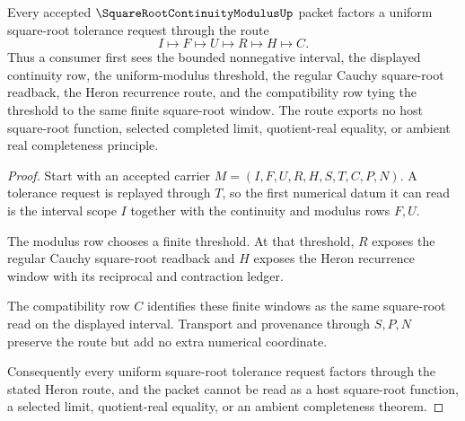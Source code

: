 \begin{theorem}
\label{thm:square-root-continuity-modulus-heron-route}
Every accepted $\SquareRootContinuityModulusUp$ packet factors a uniform square-root tolerance request through the route
$$
I \longmapsto F \longmapsto U \longmapsto R \longmapsto H \longmapsto C .
$$
Thus a consumer first sees the bounded nonnegative interval, the displayed continuity row, the uniform-modulus threshold, the regular Cauchy square-root readback, the Heron recurrence route, and the compatibility row tying the threshold to the same finite square-root window. The route exports no host square-root function, selected completed limit, quotient-real equality, or ambient real completeness principle.
\end{theorem}
\begin{proof}
Start with an accepted carrier $M=(I,F,U,R,H,S,T,C,P,N)$. A tolerance request is replayed through $T$, so the first numerical datum it can read is the interval scope $I$ together with the continuity and modulus rows $F,U$.

The modulus row chooses a finite threshold. At that threshold, $R$ exposes the regular Cauchy square-root readback and $H$ exposes the Heron recurrence window with its reciprocal and contraction ledger.

The compatibility row $C$ identifies these finite windows as the same square-root read on the displayed interval. Transport and provenance through $S,P,N$ preserve the route but add no extra numerical coordinate.

Consequently every uniform square-root tolerance request factors through the stated Heron route, and the packet cannot be read as a host square-root function, a selected limit, quotient-real equality, or an ambient completeness theorem.
\end{proof}



